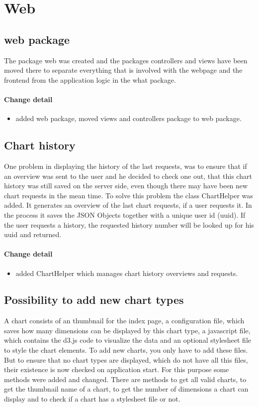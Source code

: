 \section{Web}
\subsection{web package}
The package web was created and the packages controllers and views have been moved there to separate everything that is involved with the webpage and the frontend from the application logic in the what package.

\paragraph{Change detail}
\begin{itemize}
  \item added web package, moved views and controllers package to web package.
\end{itemize}

\subsection{Chart history}
One problem in displaying the history of the last requests, was to ensure that if an overview was sent to the user and he decided to check one out, that this chart history was still saved on the server side, even though there may have been new chart requests in the mean time.
To solve this problem the class ChartHelper was added. It generates an overview of the last chart requests, 
if a user requests it. In the process it saves the JSON Objects together with a unique user id (uuid). 
If the user requests a history, the requested history number will be looked up for his uuid and returned.

\paragraph{Change detail}
\begin{itemize}
  \item added ChartHelper which manages chart history overviews and requests.
\end{itemize}

\subsection{Possibility to add new chart types}
A chart consists of an thumbnail for the index page, a configuration file, which saves how many dimensions can be displayed by this chart type,
a javascript file, which contains the d3.js code to visualize the data and an optional stylesheet file to style the chart elements.
To add new charts, you only have to add these files.
But to ensure that no chart types are displayed, which do not have all this files, their existence is now checked on application start.
For this purpose some methods were added and changed. There are methods to get all valid charts, to get the thumbnail name of a chart,
to get the number of dimensions a chart can display and to check if a chart has a stylesheet file or not.

